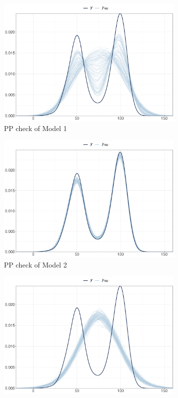 \documentclass[a4paper]{article}   	%
\begin{document}
	\begin{figure}[!htp]
		\centering
		\begin{subfigure}[t]{0.45\textwidth}
			\includegraphics[width=\linewidth]{Images/ppcheck_GSRNS}
			\caption{PP check of Model 1}
		\end{subfigure}
		\begin{subfigure}[t]{0.45\textwidth}
			\includegraphics[width=\linewidth]{Images/ppcheck_GSRand}
			\caption{PP check of Model 2}
		\end{subfigure}
		\begin{subfigure}[t]{0.45\textwidth}
			\includegraphics[width=\linewidth]{Images/ppcheck_STRNS}

\end{subfigure}
\end{figure}
\end{document}

